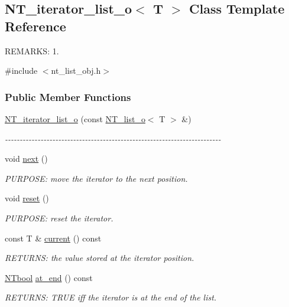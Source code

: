 \subsection{NT\_\-iterator\_\-list\_\-o$<$ T $>$ Class Template Reference}
\label{class_n_t__iterator__list__o}


REMARKS: 1.  




{\ttfamily \#include $<$nt\_\-list\_\-obj.h$>$}

\subsubsection*{Public Member Functions}
\begin{DoxyCompactItemize}
\item 
\hyperlink{class_n_t__iterator__list__o_a721a945bc848b7758e1650c6c4374ea7}{NT\_\-iterator\_\-list\_\-o} (const \hyperlink{class_n_t__list__o}{NT\_\-list\_\-o}$<$ T $>$ \&)
\begin{DoxyCompactList}\small\item\em -\/-\/-\/-\/-\/-\/-\/-\/-\/-\/-\/-\/-\/-\/-\/-\/-\/-\/-\/-\/-\/-\/-\/-\/-\/-\/-\/-\/-\/-\/-\/-\/-\/-\/-\/-\/-\/-\/-\/-\/-\/-\/-\/-\/-\/-\/-\/-\/-\/-\/-\/-\/-\/-\/-\/-\/-\/-\/-\/-\/-\/-\/-\/-\/-\/-\/-\/-\/-\/-\/-\/-\/-\/ \item\end{DoxyCompactList}\item 
void \hyperlink{class_n_t__iterator__list__o_a18c33cc4e01f56e25564f74b8ca50904}{next} ()
\begin{DoxyCompactList}\small\item\em PURPOSE: move the iterator to the next position. \item\end{DoxyCompactList}\item 
void \hyperlink{class_n_t__iterator__list__o_a48f0f98f2c6c42def8d24222fad3d300}{reset} ()
\begin{DoxyCompactList}\small\item\em PURPOSE: reset the iterator. \item\end{DoxyCompactList}\item 
const T \& \hyperlink{class_n_t__iterator__list__o_a015e2f8ff27d95a9c61470a8312190d4}{current} () const 
\begin{DoxyCompactList}\small\item\em RETURNS: the value stored at the iterator position. \item\end{DoxyCompactList}\item 
\hyperlink{nt__types_8h_a9f3200824a52174bb5be77bed3838822}{NTbool} \hyperlink{class_n_t__iterator__list__o_abafaf786b6d1ab5f282e149e6218692e}{at\_\-end} () const 
\begin{DoxyCompactList}\small\item\em RETURNS: TRUE iff the iterator is at the end of the list. \item\end{DoxyCompactList}\end{DoxyCompactItemize}


